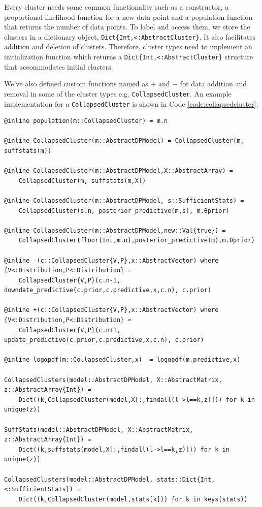 \documentclass[12pt, a4paper]{article}
\newenvironment{code}{\captionsetup{type=listing}}{}
\begin{document}
Every cluster needs some common functionality such as a constructor, a proportional likelihood function for a new data point and a population function that returns the number of data points. To label and access them, we store the clusters in a dictionary object, \texttt{Dict\{Int,<:AbstractCluster\}}. It also facilitates addition and deletion of clusters. Therefore, cluster types need to implement an initialization function which returns a \texttt{Dict\{Int,<:AbstractCluster\}} structure that accommodates initial clusters.

We've also defined custom functions named as $+$ and $-$ for data addition and removal in some of the cluster types e.g. \texttt{CollapsedCluster}. An example implementation for a \texttt{CollapsedCluster} is shown in Code \ref{code:collapsedcluster}:

\begin{code}
\begin{verbatim}
@inline population(m::CollapsedCluster) = m.n

@inline CollapsedCluster(m::AbstractDPModel) = CollapsedCluster(m, suffstats(m))

@inline CollapsedCluster(m::AbstractDPModel,X::AbstractArray) =
    CollapsedCluster(m, suffstats(m,X))

@inline CollapsedCluster(m::AbstractDPModel, s::SufficientStats) =
    CollapsedCluster(s.n, posterior_predictive(m,s), m.θprior)

@inline CollapsedCluster(m::AbstractDPModel,new::Val{true}) =
    CollapsedCluster(floor(Int,m.α),posterior_predictive(m),m.θprior)

@inline -(c::CollapsedCluster{V,P},x::AbstractVector) where {V<:Distribution,P<:Distribution} =
    CollapsedCluster{V,P}(c.n-1, downdate_predictive(c.prior,c.predictive,x,c.n), c.prior)

@inline +(c::CollapsedCluster{V,P},x::AbstractVector) where {V<:Distribution,P<:Distribution} =
    CollapsedCluster{V,P}(c.n+1, update_predictive(c.prior,c.predictive,x,c.n), c.prior)

@inline logαpdf(m::CollapsedCluster,x)  = logαpdf(m.predictive,x)

CollapsedClusters(model::AbstractDPModel, X::AbstractMatrix, z::AbstractArray{Int}) =
    Dict((k,CollapsedCluster(model,X[:,findall(l->l==k,z)])) for k in unique(z))

SuffStats(model::AbstractDPModel, X::AbstractMatrix, z::AbstractArray{Int}) =
    Dict((k,suffstats(model,X[:,findall(l->l==k,z)])) for k in unique(z))

CollapsedClusters(model::AbstractDPModel, stats::Dict{Int,<:SufficientStats}) =
    Dict((k,CollapsedCluster(model,stats[k])) for k in keys(stats))

\end{verbatim}
\label{code:collapsedcluster}
\end{code}
\end{document}
